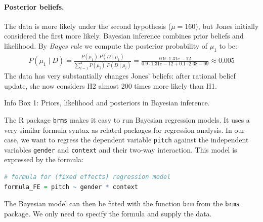 \documentclass[nobib]{tufte-handout}
\begin{document}
\begin{InfoBox}[]
{\begin{minipage}{1.0\textwidth}
     \paragraph{Posterior beliefs.} The data is more likely under the second hypothesis ($\mu = 160$), but Jones initially considered the first more likely. Bayesian inference combines prior beliefs and likelihood. By \emph{Bayes rule} we compute the posterior probability of $\mu_1$ to be:
     \begin{align*}
       P(\mu_1 \mid D) = \frac{P(\mu_1) \ P(D \mid \mu_1)}{ \sum_{i =1}^2 P(\mu_i) \ P(D \mid \mu_i)} = \frac{0.9 \cdot 1.31e-12}{ 0.9 \cdot 1.31e-12 + 0.1 \cdot 2.38-09} \approx 0.005
     \end{align*}
     The data has very substantially changes Jones' beliefs: after rational belief update, she now considers H2 almost 200 times more likely than H1.
     
  \end{minipage} \par
  } \par
  \begin{center}
    Info Box 1: Priors, likelihood and posteriors in Bayesian inference.
  \end{center}
\end{InfoBox}


The R package \texttt{brms} \citep{buerkner2016brms} makes it easy to run Bayesian regression models. It uses a very similar formula syntax as related packages for regression analysis. In our case, we want to regress the dependent variable \texttt{pitch} against the independent variables \texttt{gender} and \texttt{context} and their two-way interaction. This model is expressed by the formula:

\bigskip

\begin{minipage}[]{\textwidth}
\begin{lstlisting}[language=R]
# formula for (fixed effects) regression model
formula_FE = pitch ~ gender * context
\end{lstlisting}
\end{minipage}

The Bayesian model can then be fitted with the function \texttt{brm} from the \texttt{brms} package. We only need to specify the formula and supply the data.
\end{document}
